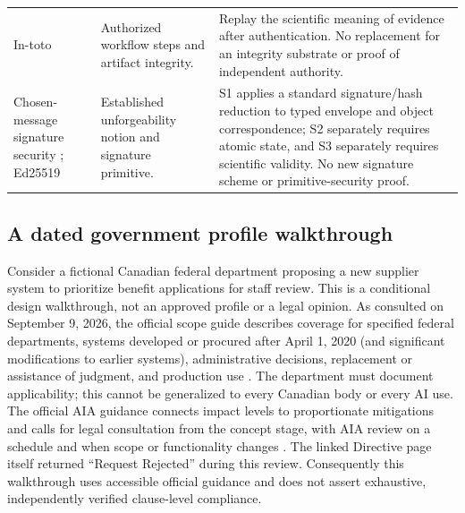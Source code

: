 \begin{table}[t]
\begin{tabularx}{\textwidth}{@{}p{}XX@{}}
In-toto \citep{torresarias2019intoto} & Authorized workflow steps and artifact integrity. & Replay the scientific meaning of evidence after authentication. No replacement for an integrity substrate or proof of independent authority. \\
Chosen-message signature security \citep{goldwasser1988signatures}; Ed25519 \citep{bernstein2012signatures,rfc8032} & Established unforgeability notion and signature primitive. & S1 applies a standard signature/hash reduction to typed envelope and object correspondence; S2 separately requires atomic state, and S3 separately requires scientific validity. No new signature scheme or primitive-security proof. \\
\bottomrule
\end{tabularx}
\end{table}

\subsection{A dated government profile walkthrough}
\label{app:canada-walkthrough}
Consider a fictional Canadian federal department proposing a new supplier
system to prioritize benefit applications for staff review. This is a
conditional design walkthrough, not an approved profile or a legal opinion.
As consulted on September 9, 2026, the official scope guide describes coverage
for specified federal departments, systems developed or procured after
April 1, 2020 (and significant modifications to earlier systems), administrative
decisions, replacement or assistance of judgment, and production use
\citep{canadaDirectiveScope}. The department must document applicability;
this cannot be generalized to every Canadian body or every AI use.
The official AIA guidance connects impact levels to proportionate mitigations
and calls for legal consultation from the concept stage, with AIA review
on a schedule and when scope or functionality changes \citep{canadaAIA}.
The linked Directive page itself returned ``Request Rejected'' during this
review. Consequently this walkthrough uses accessible official guidance and
does not assert exhaustive, independently verified clause-level compliance.

